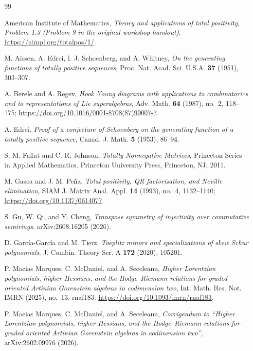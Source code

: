 \documentclass{amsart}
\numberwithin{equation}{section}
\theoremstyle{definition}
\theoremstyle{remark}
\begin{document}
\begin{thebibliography}{99}

American Institute of Mathematics,
\emph{Theory and applications of total positivity, Problem 1.3
(Problem 9 in the original workshop handout)},
\url{https://aimpl.org/totalpos/1/}.

M. Aissen, A. Edrei, I. J. Schoenberg, and A. Whitney,
\emph{On the generating functions of totally positive sequences},
Proc. Nat. Acad. Sci. U.S.A. \textbf{37} (1951), 303--307.

A. Berele and A. Regev,
\emph{Hook Young diagrams with applications to combinatorics and to representations of Lie superalgebras},
Adv. Math. \textbf{64} (1987), no.~2, 118--175;
\url{https://doi.org/10.1016/0001-8708(87)90007-7}.

A. Edrei,
\emph{Proof of a conjecture of Schoenberg on the generating function of a totally positive sequence},
Canad. J. Math. \textbf{5} (1953), 86--94.

S. M. Fallat and C. R. Johnson,
\emph{Totally Nonnegative Matrices},
Princeton Series in Applied Mathematics, Princeton University Press, Princeton, NJ, 2011.

M. Gasca and J. M. Pe\~na,
\emph{Total positivity, QR factorization, and Neville elimination},
SIAM J. Matrix Anal. Appl. \textbf{14} (1993), no.~4, 1132--1140;
\url{https://doi.org/10.1137/0614077}.

S. Gu, W. Qi, and Y. Cheng,
\emph{Transpose symmetry of injectivity over commutative semirings},
arXiv:2608.16205 (2026).

D. Garc\'ia-Garc\'ia and M. Tierz,
\emph{Toeplitz minors and specializations of skew Schur polynomials},
J. Combin. Theory Ser. A \textbf{172} (2020), 105201.

P. Macias Marques, C. McDaniel, and A. Seceleanu,
\emph{Higher Lorentzian polynomials, higher Hessians, and the Hodge--Riemann relations for graded oriented Artinian Gorenstein algebras in codimension two},
Int. Math. Res. Not. IMRN (2025), no.~13, rnaf183;
\url{https://doi.org/10.1093/imrn/rnaf183}.

P. Macias Marques, C. McDaniel, and A. Seceleanu,
\emph{Corrigendum to ``Higher Lorentzian polynomials, higher Hessians, and the Hodge--Riemann relations for graded oriented Artinian Gorenstein algebras in codimension two''},
arXiv:2602.09976 (2026).


\end{thebibliography}
\end{document}
